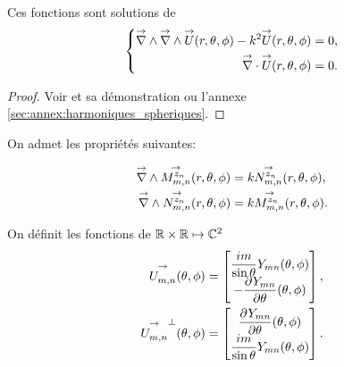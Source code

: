     \begin{prop}
        Ces fonctions sont solutions de 
        \begin{equation*}
            \left\lbrace
                \begin{aligned}
                    \vrot \vrot \vect{U}(\rtp) - k^2 \vect{U}(\rtp) &= 0,
                    \\
                    \vdiv \vect{U}(\rtp) &= 0.
                \end{aligned}
            \right.
        \end{equation*}
    \end{prop}
    \begin{proof}
        Voir \cite[Théorème.~5.3.1]{nedelec_acoustic_2001} et sa démonstration ou l'annexe \ref{sec:annex:harmoniques_spheriques}.
    \end{proof}

    On admet les propriétés suivantes:
    \begin{prop}
        \label{prop:Mmn_Nmn_rot}
        \begin{align*}
            \vrot \Mmn[z_n](\rtp) &= k\Nmn[z_n](\rtp),
            \\
            \vrot \Nmn[z_n](\rtp) &= k\Mmn[z_n](\rtp).
        \end{align*}
    \end{prop}



    \begin{defn}
        On définit les fonctions de \(\RR\times\RR\mapsto \CC^2\)
        \begin{align}
            \label{eq:defUmn_tgt}
            \Umn(\tp) &=
            \begin{bmatrix}
                \frac{im}{\sin\theta}Y_{mn}(\tp)
                \\
                - \ddr{\theta}{Y_{mn}}(\tp)
            \end{bmatrix},
            \\
            \label{eq:defNmn_tgt}
            \Umn^\perp(\tp) &=
            \begin{bmatrix}
                \ddr{\theta}{Y_{mn}}(\tp)
                \\
                \frac{im}{\sin\theta}Y_{mn}(\tp)
            \end{bmatrix}.
        \end{align}
    \end{defn}

